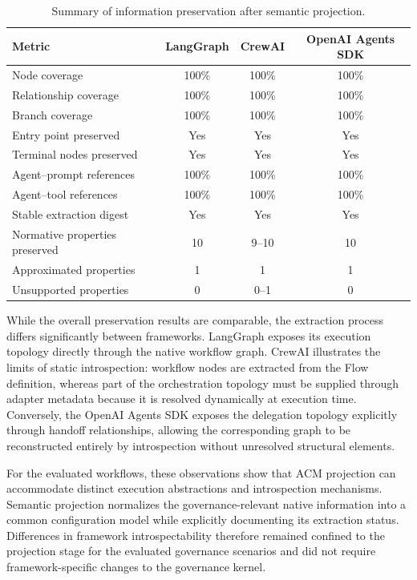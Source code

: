 \documentclass[10pt]{article}
\begin{document}
\begin{table}[t]
	\centering
	\caption{Summary of information preservation after semantic projection.}
	\label{tab:projection_results}
	\small
	\begin{tabular}{lccc}
		\toprule
		\textbf{Metric}
		&
		\textbf{LangGraph}
		&
		\textbf{CrewAI}
		&
		\textbf{OpenAI Agents SDK}
		\\
		\midrule
		Node coverage & 100\% & 100\% & 100\% \\
		Relationship coverage & 100\% & 100\% & 100\% \\
		Branch coverage & 100\% & 100\% & 100\% \\
		Entry point preserved & Yes & Yes & Yes \\
		Terminal nodes preserved & Yes & Yes & Yes \\
		Agent--prompt references & 100\% & 100\% & 100\% \\
		Agent--tool references & 100\% & 100\% & 100\% \\
		Stable extraction digest & Yes & Yes & Yes \\
		Normative properties preserved & 10 & 9--10 & 10 \\
		Approximated properties & 1 & 1 & 1 \\
		Unsupported properties & 0 & 0--1 & 0 \\
		\bottomrule
	\end{tabular}
\end{table}

While the overall preservation results are comparable, the extraction process differs significantly between frameworks. LangGraph exposes its execution topology directly through the native workflow graph. CrewAI illustrates the limits of static introspection: workflow nodes are extracted from the Flow definition, whereas part of the orchestration topology must be supplied through adapter metadata because it is resolved dynamically at execution time. Conversely, the OpenAI Agents SDK exposes the delegation topology explicitly through handoff relationships, allowing the corresponding graph to be reconstructed entirely by introspection without unresolved structural elements.

For the evaluated workflows, these observations show that ACM projection can accommodate distinct execution abstractions and introspection mechanisms. Semantic projection normalizes the governance-relevant native information into a common configuration model while explicitly documenting its extraction status. Differences in framework introspectability therefore remained confined to the projection stage for the evaluated governance scenarios and did not require framework-specific changes to the governance kernel.
\end{document}
